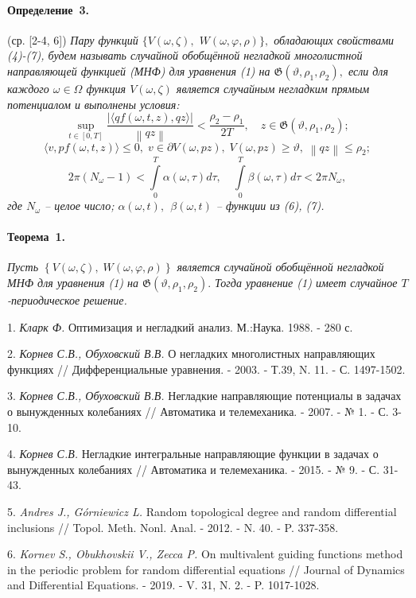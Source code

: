 \paragraph{Определение~3.} (ср. [2-4, 6])
{\it
Пару функций $\{ V(\omega,\zeta),$ \linebreak $W(\omega,\varphi,\rho ) \},$ обладающих свойствами (4)-(7),
будем называть случайной обобщённой негладкой многолистной на\-прав\-ляющей функцией (МНФ) для уравнения (1) на \linebreak $\mathfrak{G} \left({\vartheta ,\rho _{1} ,\rho _{2} } \right),$ если для каждого $\omega\in\Omega$ функция $V(\omega,\zeta)$ является случайным негладким прямым потенциалом и выполнены условия:
$$
 \mathop {\sup}\limits_{t \in \left[ {0,T} \right]}\frac{{\left| {\langle {qf(\omega, t, z),qz} \rangle} \right|}}{{\left\|{qz} \right\|}} < \frac{{\rho _{2} - \rho _{1} }}{{2T}},\quad z\in \mathfrak{G} (\vartheta ,\rho _{1} ,\rho _{2} );
$$
$$
\langle v, pf(\omega, t, z)\rangle \leq 0,\; v \in \partial V(\omega,pz),\; V(\omega,pz) \ge \vartheta ,\;\left\| {qz} \right\| \le \rho _{2};
$$
$$
2\pi (N_{\omega} - 1) < \int\limits_{0}^{T} {\alpha(\omega,\tau )d\tau } , \quad
\int\limits_{0}^{T} {\beta(\omega,\tau )d\tau < 2\pi N_{\omega}} ,
$$
где $N_{\omega}$ -- целое число; $\alpha(\omega,t),\,\;\beta(\omega,t)$ -- функции из (6), (7).
}

\paragraph{Теорема~1.}
{\it
Пусть $\left\{ {V(\omega,\zeta),\;W(\omega,\varphi,\rho )} \right\}$ является случайной обобщённой негладкой МНФ для уравнения (1) на \linebreak $\mathfrak{G} \left({\vartheta ,\rho _{1} ,\rho _{2} } \right).$   Тогда уравнение (1) имеет случайное $T$-пе\-риоди\-ческое ре\-ше\-ние.
}


\litlist

1. {\it Кларк Ф.}
Оптимизация и негладкий анализ. М.:Наука. 1988. - 280 с.

2. {\it Корнев С.В., Обуховский В.В.}
О негладких многолистных направляющих функциях // Дифференциальные уравнения. - 2003. - Т.39, N. 11. - С. 1497-1502.

3. {\it Корнев С.В., Обуховский В.В.}
Негладкие направляющие потенциалы в задачах о вынужденных колебаниях // Автоматика и телемеханика. - 2007. - № 1. - С. 3-10.

4. {\it Корнев С.В.}
Негладкие интегральные направляющие функции в задачах о вынужденных колебаниях // Автоматика и телемеханика. - 2015. - № 9. - С. 31-43.

5. {\it Andres J., G\'orniewicz L.}
Random topological degree and random differential inclusions // Topol. Meth. Nonl. Anal. - 2012. - N. 40. - P. 337-358.

6. {\it Kornev S., Obukhovskii V., Zecca P.}
On multivalent guiding functions method in the periodic problem for random differential equations // Journal of Dynamics and Differential Equations. - 2019. - V. 31, N. 2. - P. 1017-1028.
